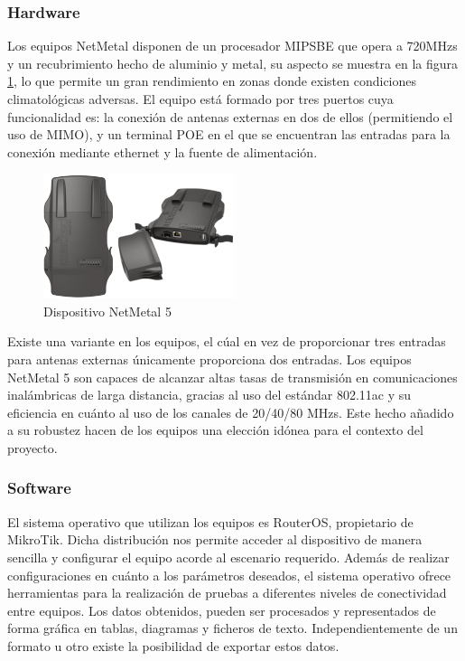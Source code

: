 	\subsubsection{Hardware}
	Los equipos NetMetal disponen de un procesador MIPSBE que opera a 720MHzs y un recubrimiento hecho de aluminio y metal, su aspecto se muestra en la figura \ref{equipo}, lo que permite un gran rendimiento en zonas donde existen condiciones climatológicas adversas. El equipo está formado por tres puertos cuya funcionalidad es: la conexión de antenas externas en dos de ellos (permitiendo el uso de MIMO), y un terminal POE en el que se encuentran las entradas para la conexión mediante ethernet y la fuente de alimentación.
	\begin{figure}[H]
		\centering
		\includegraphics[width=0.5\textwidth]{img/netMetal5.png}
		\caption{Dispositivo NetMetal 5}
		\label{equipo}
	\end{figure}
	Existe una variante en los equipos, el cúal en vez de proporcionar tres entradas para antenas externas únicamente proporciona dos entradas.
	Los equipos NetMetal 5 son capaces de alcanzar altas tasas de transmisión en comunicaciones inalámbricas de larga distancia, gracias al uso del estándar 802.11ac y su eficiencia en cuánto al uso de los canales de 20/40/80 MHzs. Este hecho añadido a su robustez hacen de los equipos una elección idónea para el contexto del proyecto.
	
	\subsubsection{Software}
	El sistema operativo que utilizan los equipos es RouterOS, propietario de MikroTik. Dicha distribución nos permite acceder al dispositivo de manera sencilla y configurar el equipo acorde al escenario requerido. Además de realizar configuraciones en cuánto a los parámetros deseados, el sistema operativo ofrece herramientas para la realización de pruebas a diferentes niveles de conectividad entre equipos. Los datos obtenidos, pueden ser procesados y representados de forma gráfica en tablas, diagramas y ficheros de texto. Independientemente de un formato u otro existe la posibilidad de exportar estos datos.\\\\
	
